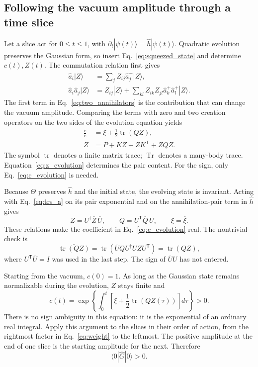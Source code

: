 \documentclass[11pt,a4paper]{article}
\newcommand{\Tr}{\operatorname{Tr}}
\newcommand{\tr}{\operatorname{tr}}
\newcommand{\trans}{\mathsf T}
\numberwithin{equation}{section}
\begin{document}
\subsection{Following the vacuum amplitude through a time slice}
\label{sec:evolution}

Let a slice act for $0\leq t\leq1$, with
$\partial_t|\psi(t)\rangle=\hat h|\psi(t)\rangle$. Quadratic evolution
preserves the Gaussian form, so insert Eq.~\eqref{eq:squeezed_state} and
determine $c(t),Z(t)$. The commutation relation first gives
\begin{align}
 \hat a_i|Z\rangle&=\sum_j Z_{ij}\hat a_j^+|Z\rangle,
 \label{eq:one_annihilator}\\
 \hat a_i\hat a_j|Z\rangle
 &=Z_{ij}|Z\rangle+
   \sum_{kl}Z_{ik}Z_{jl}\hat a_k^+\hat a_l^+|Z\rangle.
 \label{eq:two_annihilators}
\end{align}
The first term in Eq.~\eqref{eq:two_annihilators} is the contribution that
can change the vacuum amplitude. Comparing the terms with zero and two
creation operators on the two sides of the evolution equation yields
\begin{align}
 \frac{\dot c}{c}&=\xi+\frac12\tr(QZ),
 \label{eq:c_evolution}\\
 \dot Z&=P+KZ+ZK^\trans+ZQZ.
 \label{eq:z_evolution}
\end{align}
The symbol $\tr$ denotes a finite matrix trace; $\Tr$ denotes a many-body
trace. Equation~\eqref{eq:z_evolution} determines the pair content. For the
sign, only Eq.~\eqref{eq:c_evolution} is needed.

Because $\Theta$ preserves $\hat h$ and the initial state, the evolving
state is invariant. Acting with Eq.~\eqref{eq:trs_a} on its pair exponential
and on the annihilation-pair term in $\hat h$ gives
\begin{equation}
 Z=U^\dagger\overline Z\,\overline U,
 \qquad Q=U^\trans\overline Q\,U,
 \qquad \xi=\overline\xi.
 \label{eq:qz_reality}
\end{equation}
These relations make the coefficient in Eq.~\eqref{eq:c_evolution} real.
The nontrivial check is
\begin{equation}
 \overline{\tr(QZ)}
 =\tr\!\left(\overline U Q U^\dagger UZ U^\trans\right)
 =\tr(QZ),
 \label{eq:trace_qz_real}
\end{equation}
where $U^\trans\overline U=I$ was used in the last step. The sign of
$\overline U U$ has not entered.

Starting from the vacuum, $c(0)=1$. As long as the Gaussian state remains
normalizable during the evolution, $Z$ stays finite and
\begin{equation}
 c(t)=\exp\!\left\{\int_0^t
 \left[\xi+\frac12\tr(QZ(\tau))\right]d\tau\right\}>0.
 \label{eq:c_positive}
\end{equation}
There is no sign ambiguity in this equation: it is the exponential of an
ordinary real integral. Apply this argument to the slices in their order of
action, from the rightmost factor in Eq.~\eqref{eq:weight} to the leftmost.
The positive amplitude at the end of one slice is the starting amplitude for
the next. Therefore
\begin{equation}
 \langle0|\hat G|0\rangle>0.
 \label{eq:vacuum_positive}
\end{equation}
\end{document}
